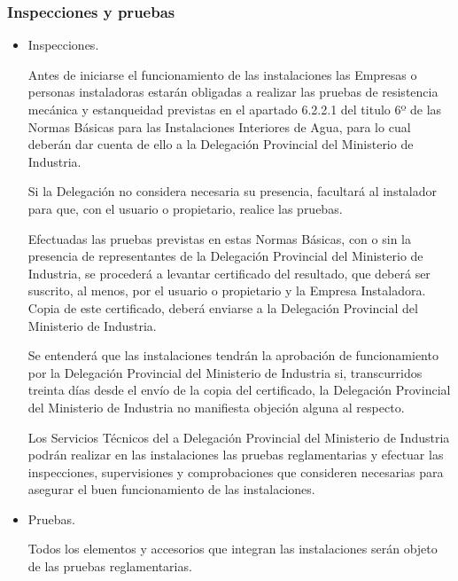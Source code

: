 \documentclass[../main.tex]{subfiles}
\begin{document}
\subsubsection{Inspecciones y pruebas}
\begin{itemize}
    \item Inspecciones. \par
    \vspace{0.5 cm}
    Antes de iniciarse el funcionamiento de las instalaciones las Empresas o personas instaladoras estarán obligadas a realizar las pruebas de resistencia mecánica y estanqueidad previstas en el apartado 6.2.2.1 del titulo 6º de las Normas Básicas para las Instalaciones Interiores de Agua, para lo cual deberán dar cuenta de ello a la Delegación Provincial del Ministerio de Industria. \par
    \vspace{0.5 cm}
    Si la Delegación no considera necesaria su presencia, facultará al instalador para que, con el usuario o propietario, realice las pruebas. \par
    \vspace{0.5 cm}
    Efectuadas las pruebas previstas en estas Normas Básicas, con o sin la presencia de representantes de la Delegación Provincial del Ministerio de Industria, se procederá a levantar certificado del resultado, que deberá ser suscrito, al menos, por el usuario o propietario y la Empresa Instaladora. Copia de este certificado, deberá enviarse a la Delegación Provincial del Ministerio de Industria. \par
    Se entenderá que las instalaciones tendrán la aprobación de funcionamiento por la Delegación Provincial del Ministerio de Industria si, transcurridos treinta días desde el envío de la copia del certificado, la Delegación Provincial del Ministerio de Industria no manifiesta objeción alguna al respecto. \par
    \vspace{0.5 cm}
    Los Servicios Técnicos del a Delegación Provincial del Ministerio de Industria podrán realizar en las instalaciones las pruebas reglamentarias y efectuar las inspecciones, supervisiones y comprobaciones que consideren necesarias para asegurar el buen funcionamiento de las instalaciones. \par 
    \vspace{0.5 cm}
    \item Pruebas. \par
    \vspace{0.5 cm}
    Todos los elementos y accesorios que integran las instalaciones serán objeto de las pruebas reglamentarias. \par

\end{itemize}
\end{document}

